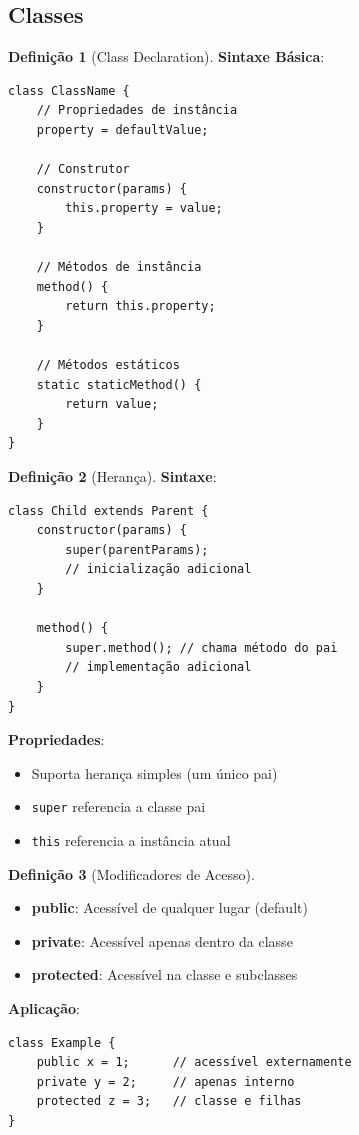 \documentclass[12pt,a4paper]{article}
\theoremstyle{definition}
\newtheorem{definition}{Definição}[section]
\begin{document}
\subsection{Classes}

\begin{definition}[Class Declaration]
\textbf{Sintaxe Básica}:
\begin{verbatim}
class ClassName {
    // Propriedades de instância
    property = defaultValue;
    
    // Construtor
    constructor(params) {
        this.property = value;
    }
    
    // Métodos de instância
    method() {
        return this.property;
    }
    
    // Métodos estáticos
    static staticMethod() {
        return value;
    }
}
\end{verbatim}
\end{definition}

\begin{definition}[Herança]
\textbf{Sintaxe}:
\begin{verbatim}
class Child extends Parent {
    constructor(params) {
        super(parentParams);
        // inicialização adicional
    }
    
    method() {
        super.method(); // chama método do pai
        // implementação adicional
    }
}
\end{verbatim}

\textbf{Propriedades}:
\begin{itemize}
    \item Suporta herança simples (um único pai)
    \item \texttt{super} referencia a classe pai
    \item \texttt{this} referencia a instância atual
\end{itemize}
\end{definition}

\begin{definition}[Modificadores de Acesso]
\begin{itemize}
    \item \textbf{public}: Acessível de qualquer lugar (default)
    \item \textbf{private}: Acessível apenas dentro da classe
    \item \textbf{protected}: Acessível na classe e subclasses
\end{itemize}

\textbf{Aplicação}:
\begin{verbatim}
class Example {
    public x = 1;      // acessível externamente
    private y = 2;     // apenas interno
    protected z = 3;   // classe e filhas
}
\end{verbatim}
\end{definition}
\end{document}
